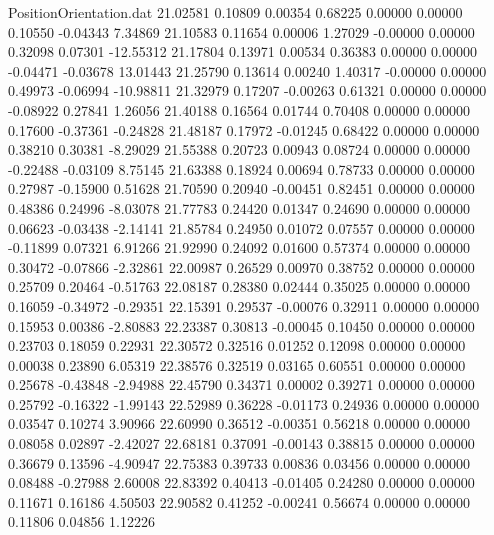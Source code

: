 \begin{filecontents}{PositionOrientation.dat}
  21.02581    0.10809    0.00354     0.68225    0.00000    0.00000    0.10550   -0.04343    7.34869
  21.10583    0.11654    0.00006     1.27029   -0.00000    0.00000    0.32098    0.07301  -12.55312
  21.17804    0.13971    0.00534     0.36383    0.00000    0.00000   -0.04471   -0.03678   13.01443
  21.25790    0.13614    0.00240     1.40317   -0.00000    0.00000    0.49973   -0.06994  -10.98811
  21.32979    0.17207   -0.00263     0.61321    0.00000    0.00000   -0.08922    0.27841    1.26056
  21.40188    0.16564    0.01744     0.70408    0.00000    0.00000    0.17600   -0.37361   -0.24828
  21.48187    0.17972   -0.01245     0.68422    0.00000    0.00000    0.38210    0.30381   -8.29029
  21.55388    0.20723    0.00943     0.08724    0.00000    0.00000   -0.22488   -0.03109    8.75145
  21.63388    0.18924    0.00694     0.78733    0.00000    0.00000    0.27987   -0.15900    0.51628
  21.70590    0.20940   -0.00451     0.82451    0.00000    0.00000    0.48386    0.24996   -8.03078
  21.77783    0.24420    0.01347     0.24690    0.00000    0.00000    0.06623   -0.03438   -2.14141
  21.85784    0.24950    0.01072     0.07557    0.00000    0.00000   -0.11899    0.07321    6.91266
  21.92990    0.24092    0.01600     0.57374    0.00000    0.00000    0.30472   -0.07866   -2.32861
  22.00987    0.26529    0.00970     0.38752    0.00000    0.00000    0.25709    0.20464   -0.51763
  22.08187    0.28380    0.02444     0.35025    0.00000    0.00000    0.16059   -0.34972   -0.29351
  22.15391    0.29537   -0.00076     0.32911    0.00000    0.00000    0.15953    0.00386   -2.80883
  22.23387    0.30813   -0.00045     0.10450    0.00000    0.00000    0.23703    0.18059    0.22931
  22.30572    0.32516    0.01252     0.12098    0.00000    0.00000    0.00038    0.23890    6.05319
  22.38576    0.32519    0.03165     0.60551    0.00000    0.00000    0.25678   -0.43848   -2.94988
  22.45790    0.34371    0.00002     0.39271    0.00000    0.00000    0.25792   -0.16322   -1.99143
  22.52989    0.36228   -0.01173     0.24936    0.00000    0.00000    0.03547    0.10274    3.90966
  22.60990    0.36512   -0.00351     0.56218    0.00000    0.00000    0.08058    0.02897   -2.42027
  22.68181    0.37091   -0.00143     0.38815    0.00000    0.00000    0.36679    0.13596   -4.90947
  22.75383    0.39733    0.00836     0.03456    0.00000    0.00000    0.08488   -0.27988    2.60008
  22.83392    0.40413   -0.01405     0.24280    0.00000    0.00000    0.11671    0.16186    4.50503
  22.90582    0.41252   -0.00241     0.56674    0.00000    0.00000    0.11806    0.04856    1.12226

\end{filecontents}
